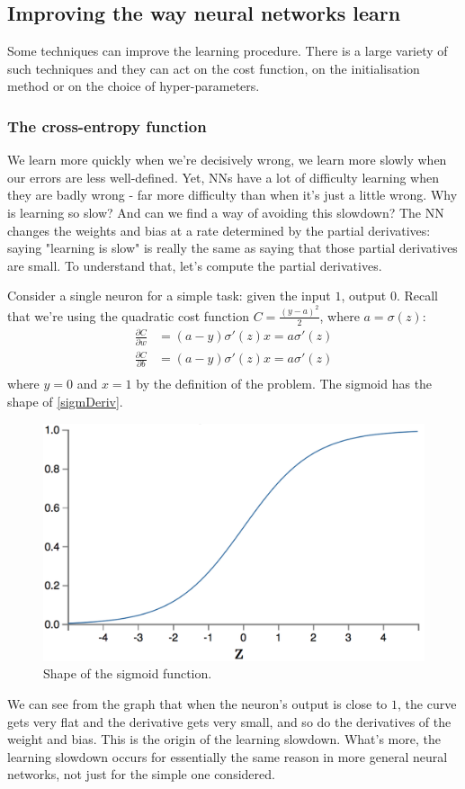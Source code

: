 \documentclass[12pt, letterpaper]{article}
\theoremstyle{definition}
\begin{document}
\subsection{Improving the way neural networks learn}
Some techniques can improve the learning procedure. There is a large variety of such techniques and they can act on the cost function, on the initialisation method or on the choice of hyper-parameters.

\subsubsection{The cross-entropy function}
We learn more quickly when we're decisively wrong, we learn more slowly when our errors are less well-defined. Yet, NNs have a lot of difficulty learning when they are badly wrong - far more difficulty than when it's just a little wrong. Why is learning so slow? And can we find a way of avoiding this slowdown? The NN changes the weights and bias at a rate determined by the partial derivatives: saying "learning is slow" is really the same as saying that those partial derivatives are small. To understand that, let's compute the partial derivatives. 

Consider a single neuron for a simple task: given the input $1$, output $0$. Recall that we're using the quadratic cost function $C= \frac{(y-a)^2}{2}$, where $a = \sigma(z)$:
\begin{equation}
\begin{aligned}
\frac{\partial C}{\partial w} &=(a-y)\sigma'(z) x = a\sigma'(z)\\
\frac{\partial C}{\partial b} &=(a-y)\sigma'(z) x = a\sigma'(z)\\
\end{aligned}
\end{equation}
where $y=0$ and $x=1$ by the definition of the problem. The sigmoid has the shape of \autoref{sigmDeriv}.
\begin{figure}
\centering
\includegraphics[scale=0.25]{img/sigmoid2}
\caption{Shape of the sigmoid function.}
\label{sigmDeriv}
\end{figure}
We can see from the graph that when the neuron's output is close to $1$, the curve gets very flat and the derivative gets very small, and so do the derivatives of the weight and bias. This is the origin of the learning slowdown. What's more, the learning slowdown occurs for essentially the same reason in more general neural networks, not just for the simple one considered.
\end{document}
